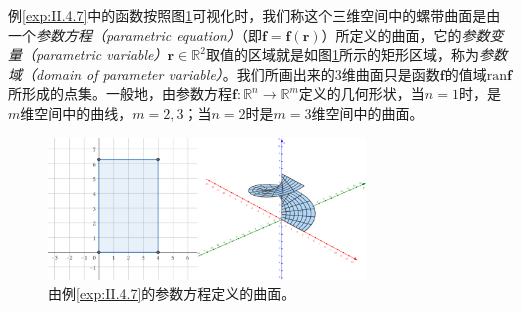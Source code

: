 \documentclass[main.tex]{subfiles}
\begin{document}
例\ref{exp:II.4.7}中的函数按照图\ref{fig:II.4.4}可视化时，我们称这个三维空间中的螺带曲面是由一个\emph{参数方程（parametric equation）}（即$\mathbf{f}=\mathbf{f}\left(\mathbf{r}\right)$）所定义的曲面，它的\emph{参数变量（parametric variable）}$\mathbf{r}\in\mathbb{R}^2$取值的区域就是如图\ref{fig:II.4.4}所示的矩形区域，称为\emph{参数域（domain of parameter variable）}。我们所画出来的3维曲面只是函数$\mathbf{f}$的值域$\mathrm{ran}\mathbf{f}$所形成的点集。一般地，由参数方程$\mathbf{f}:\mathbb{R}^n\rightarrow\mathbb{R}^m$定义的几何形状，当$n=1$时，是$m$维空间中的曲线，$m=2,3$；当$n=2$时是$m=3$维空间中的曲面。

\begin{figure}[ht]
    \centering
    \includegraphics[width=0.75\textwidth]{images/II.4.4.png}
    \caption{由例\ref{exp:II.4.7}的参数方程定义的曲面。}
    \label{fig:II.4.4}
\end{figure}
\end{document}
